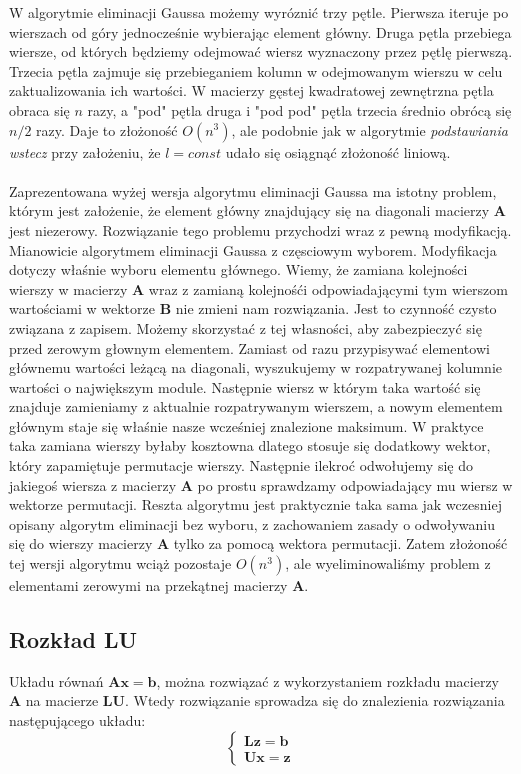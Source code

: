 \documentclass[]{article}
\begin{document}
W algorytmie eliminacji Gaussa możemy wyróznić trzy pętle. Pierwsza iteruje po wierszach od góry jednocześnie wybierając element główny. Druga pętla przebiega wiersze, od których będziemy odejmować wiersz wyznaczony przez pętlę pierwszą. Trzecia pętla zajmuje się przebieganiem kolumn w odejmowanym wierszu w celu zaktualizowania ich wartości. W macierzy gęstej kwadratowej zewnętrzna pętla obraca się $n$ razy, a "pod" pętla druga i "pod pod" pętla trzecia średnio obrócą się $n/2$ razy. Daje to złożoność $O(n^3)$, ale podobnie jak w algorytmie \textit{podstawiania wstecz} przy założeniu, że $l = const$ udało się osiągnąć złożoność liniową.
\\\\
Zaprezentowana wyżej wersja algorytmu eliminacji Gaussa ma istotny problem, którym jest założenie, że element główny znajdujący się na diagonali macierzy \textbf{A} jest niezerowy. Rozwiązanie tego problemu przychodzi wraz z pewną modyfikacją. Mianowicie algorytmem eliminacji Gaussa z częsciowym wyborem. Modyfikacja dotyczy właśnie wyboru elementu głównego. Wiemy, że zamiana kolejności wierszy w macierzy \textbf{A} wraz z zamianą kolejnośći odpowiadającymi tym wierszom wartościami w wektorze \textbf{B} nie zmieni nam rozwiązania. Jest to czynność czysto związana z zapisem. Możemy skorzystać z tej własności, aby zabezpieczyć się przed zerowym głownym elementem. Zamiast od razu przypisywać elementowi głównemu wartości leżącą na diagonali, wyszukujemy w rozpatrywanej kolumnie wartości o największym module. Następnie wiersz w którym taka wartość się znajduje zamieniamy z aktualnie rozpatrywanym wierszem, a nowym elementem głównym staje się właśnie nasze wcześniej znalezione maksimum. W praktyce taka zamiana wierszy byłaby kosztowna dlatego stosuje się dodatkowy wektor, który zapamiętuje permutacje wierszy. Następnie ilekroć odwołujemy się do jakiegoś wiersza z macierzy \textbf{A} po prostu sprawdzamy odpowiadający mu wiersz w wektorze permutacji. Reszta algorytmu jest praktycznie taka sama jak wczesniej opisany algorytm eliminacji bez wyboru, z zachowaniem zasady o odwoływaniu się do wierszy macierzy \textbf{A} tylko za pomocą wektora permutacji. Zatem złożoność tej wersji algorytmu wciąż pozostaje $O(n^3)$, ale wyeliminowaliśmy problem z elementami zerowymi na przekątnej macierzy \textbf{A}.

\subsection{Rozkład LU}
Układu równań $\mathbf{Ax} = \mathbf{b}$, można rozwiązać z wykorzystaniem rozkładu macierzy \textbf{A} na macierze \textbf{LU}. Wtedy rozwiązanie sprowadza się do znalezienia rozwiązania następującego układu:
\[\begin{cases}
\mathbf{Lz} = \mathbf{b}\\
\mathbf{Ux} = \mathbf{z}
\end{cases}\]
\end{document}

